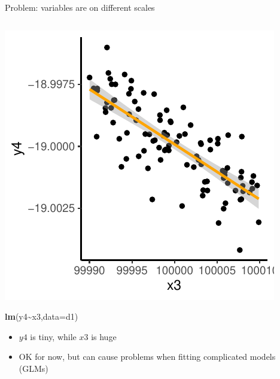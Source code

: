 \documentclass[
  ignorenonframetext,
  aspectratio=169]{beamer}
\newenvironment{Shaded}{\begin{snugshade}}{\end{snugshade}}
\newcommand{\AttributeTok}[1]{\textcolor[rgb]{0.13,0.29,0.53}{#1}}
\newcommand{\FunctionTok}[1]{\textcolor[rgb]{0.13,0.29,0.53}{\textbf{#1}}}
\newcommand{\NormalTok}[1]{#1}
\newcommand{\SpecialCharTok}[1]{\textcolor[rgb]{0.81,0.36,0.00}{\textbf{#1}}}
\providecommand{\tightlist}{%
  \setlength{\itemsep}{0pt}\setlength{\parskip}{0pt}}
\let\oldShaded\Shaded %
\let\endoldShaded\endShaded
\renewenvironment{Shaded}{\scriptsize\oldShaded}{\endoldShaded}
\begin{document}
\begin{frame}[fragile]{Problem: variables are on different scales}
\protect\hypertarget{problem-variables-are-on-different-scales}{}
\begin{columns}[T]
\begin{column}{0.48\textwidth}
\includegraphics{03-Lecture_files/figure-beamer/unnamed-chunk-43-1.pdf}
\small

\begin{Shaded}
\begin{Highlighting}[]
\FunctionTok{lm}\NormalTok{(y4}\SpecialCharTok{\textasciitilde{}}\NormalTok{x3,}\AttributeTok{data=}\NormalTok{d1)}
\end{Highlighting}
\end{Shaded}

\begin{itemize}[<+->]
\tightlist
\item
  \(y4\) is tiny, while \(x3\) is huge
\item
  OK for now, but can cause problems when fitting complicated models
  (GLMs)
\end{itemize}
\end{column}


\end{columns}
\end{frame}
\end{document}
